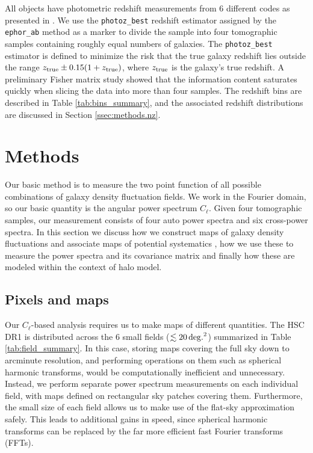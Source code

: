 \documentclass[a4paper,11pt]{article}
\begin{document}
  All objects have photometric redshift measurements from 6 different codes as presented in \cite{2018PASJ...70S...9T}. We use the {\tt photoz\_best} redshift estimator assigned by the {\tt ephor\_ab} method as a marker to divide the sample into four tomographic samples containing roughly equal numbers of galaxies. The {\tt photoz\_best} estimator is defined to minimize the risk that the true galaxy redshift lies outside the range $z_{\rm true}\pm 0.15(1+z_{\rm true})$, where $z_{\rm true}$ is the galaxy's true redshift. A preliminary Fisher matrix study showed that the information content saturates quickly when slicing the data into more than four samples. The redshift bins are described in Table \ref{tab:bins_summary}, and the associated redshift distributions are discussed in Section \ref{ssec:methods.nz}.

\section{Methods}\label{sec:methods}

Our basic method is to measure the two point function of all possible combinations of galaxy density fluctuation fields. We work in the Fourier domain, so our basic quantity is the angular power spectrum $C_\ell$. Given four tomographic samples, our measurement consists of four auto power spectra and six cross-power spectra. In this section we discuss how we construct maps of galaxy density fluctuations and associate maps of potential systematics , how we use these to measure the power spectra and its covariance matrix and finally how these are modeled within the context of halo model.


  \subsection{Pixels and maps}\label{ssec:methods.pix}
    Our $C_\ell$-based analysis requires us to make maps of different quantities. The HSC DR1 is distributed across the 6 small fields ($\lesssim20\,{\rm deg.}^2$) summarized in Table \ref{tab:field_summary}. In this case, storing maps covering the full sky down to arcminute resolution, and performing operations on them such as spherical harmonic transforms, would be computationally inefficient and unnecessary. Instead, we perform separate power spectrum measurements on each individual field, with maps defined on rectangular sky patches covering them. Furthermore, the small size of each field allows us to make use of the flat-sky approximation safely. This leads to additional gains in speed, since spherical harmonic transforms can be replaced by the far more efficient fast Fourier transforms (FFTs).
    
\end{document}
